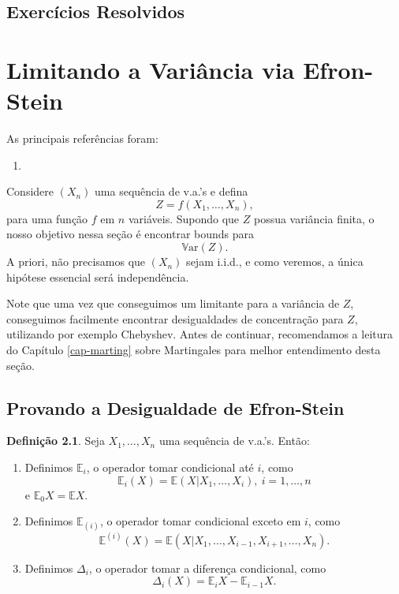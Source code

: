 \documentclass[12pt,a4paper,oneside]{book}
\theoremstyle{definition}
\newtheorem{definition}[theorem]{Defini\c{c}\~ao}
\theoremstyle{remark}
\numberwithin{equation}{section}
\newcommand{\E}{\mathbb{E}}
\newcommand{\Var}{\mathbb{V}\text{ar}}
\begin{document}
\newpage
\section{Exercícios Resolvidos}





\chapter{Limitando a Variância via Efron-Stein}

\begin{tcolorbox}[colback= white]
As principais referências foram:
\begin{enumerate}
\item \cite{boucheron2013concentration}
\end{enumerate}
\end{tcolorbox}



Considere $(X_n)$ uma sequência de v.a.'s e defina 
$$Z = f(X_1,\dots,X_n),$$
para uma função $f$ em $n$ variáveis. Supondo que $Z$ possua variância finita, o nosso objetivo nessa seção é encontrar bounds para
$$\Var(Z).$$  
A priori, não precisamos que $(X_n)$ sejam i.i.d., e como veremos, a única hipótese essencial será independência.

Note que uma vez que conseguimos um limitante para a variância de $Z$, conseguimos facilmente encontrar desigualdades de concentração para $Z$, utilizando por exemplo Chebyshev.
Antes de continuar, recomendamos a leitura do Capítulo \ref{cap-marting} sobre Martingales para melhor entendimento desta seção. 


\section{Provando a Desigualdade de Efron-Stein}


\begin{definition}\label{def-operador-Ei}
Seja $X_1,\dots,X_n$ uma sequência de v.a.'s. Então:
\begin{enumerate}
\item Definimos $\E_i$, o operador tomar condicional até $i$, como
$$\E_i(X) = \E(X|X_1,\dots,X_i),\ i=1,\dots,n $$
e   $\E_0X=\E X$.

\item Definimos $\E_{(i)}$, o operador tomar condicional exceto em $i$, como
$$\E^{(i)}(X) = \E(X|X_1,\dots, X_{i-1},X_{i+1},\dots, X_n). $$

\item Definimos $\Delta_i$, o operador tomar a diferença condicional, como
$$\Delta_i(X) = \E_i X - \E_{i-1}X. $$
\end{enumerate}

\end{definition}
\end{document}
